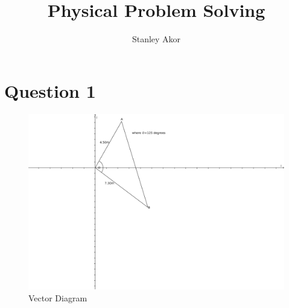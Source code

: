 \documentclass[10pt,a4paper]{article}
\author{Stanley Akor}
\title{Physical Problem Solving}
\begin{document}
\maketitle
\newpage
\section*{Question 1}
\begin{figure}[h!]\label{d1}
\centering
\includegraphics[scale=0.3]{qsn1.png}
\caption{Vector Diagram}
\end{figure}
\end{document}
